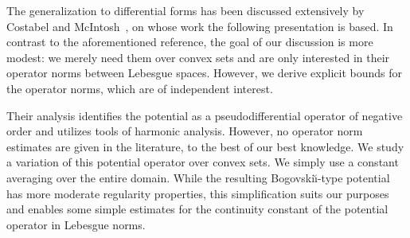 \documentclass[a4paper]{article}
\begin{document}
    The generalization to differential forms has been discussed extensively by Costabel and McIntosh~\cite{costabel2010bogovskiui},
    on whose work the following presentation is based. 
    In contrast to the aforementioned reference, the goal of our discussion is more modest:
    we merely need them over convex sets and are only interested in their operator norms between Lebesgue spaces.
    However, we derive explicit bounds for the operator norms, which are of independent interest. 

    
    Their analysis identifies the potential as a pseudodifferential operator of negative order and utilizes tools of harmonic analysis. However, no operator norm estimates are given in the literature, to the best of our best knowledge.
    We study a variation of this potential operator over convex sets.
    We simply use a constant averaging over the entire domain. 
    While the resulting Bogovski\u{\i}-type potential has more moderate regularity properties, 
    this simplification suits our purposes and enables some simple estimates for the continuity constant of the potential operator in Lebesgue norms. 
\end{document}
